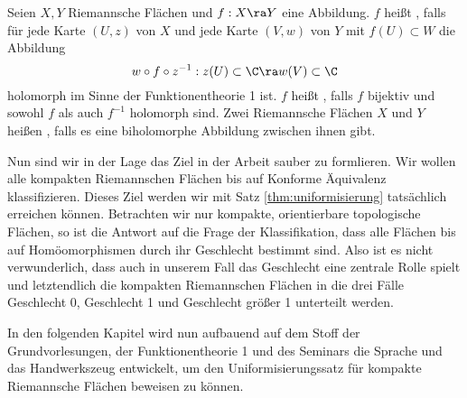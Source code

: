 \begin{defin}
  Seien $X,Y$ Riemannsche Flächen und $f: X \ra Y$ eine Abbildung. $f$
  heißt , falls für jede Karte $(U,z)$ von $X$ und
  jede Karte $(V, w)$ von $Y$ mit $f(U) \subset W$ die Abbildung
  \[
  w \circ f \circ z^{-1} : z(U) \subset \C \ra w(V) \subset \C
  \]
  holomorph im Sinne der Funktionentheorie 1 ist. $f$ heißt
  , falls $f$ bijektiv und sowohl $f$ als auch $f^{-1}$
  holomorph sind. Zwei Riemannsche Flächen $X$ und $Y$ heißen , falls es eine biholomorphe Abbildung zwischen ihnen gibt.
\end{defin}

Nun sind wir in der Lage das Ziel in der Arbeit sauber zu
formlieren. Wir wollen alle kompakten Riemannschen Flächen bis auf
Konforme Äquivalenz klassifizieren. Dieses Ziel werden wir mit Satz
\ref{thm:uniformisierung} tatsächlich erreichen können. Betrachten wir
nur kompakte, orientierbare topologische Flächen, so ist die Antwort
auf die Frage der Klassifikation, dass alle Flächen bis auf
Homöomorphismen durch ihr Geschlecht bestimmt sind. Also ist es nicht
verwunderlich, dass auch in unserem Fall das Geschlecht eine zentrale
Rolle spielt und letztendlich die kompakten Riemannschen Flächen in
die drei Fälle Geschlecht 0, Geschlecht 1 und Geschlecht größer 1
unterteilt werden.

In den folgenden Kapitel wird nun aufbauend auf dem Stoff der
Grundvorlesungen, der Funktionentheorie 1 und des Seminars die Sprache
und das Handwerkszeug entwickelt, um den Uniformisierungssatz für
kompakte Riemannsche Flächen beweisen zu können.


